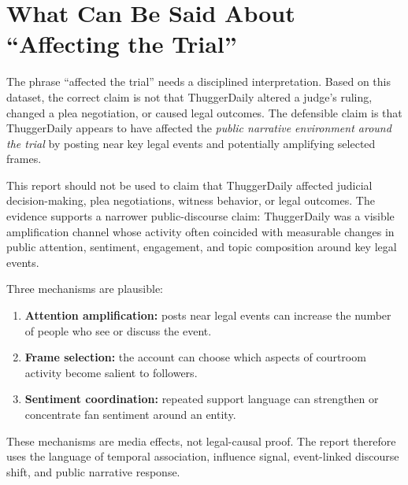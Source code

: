 \documentclass[12pt]{article}
\begin{document}
\section{What Can Be Said About ``Affecting the Trial''}
The phrase ``affected the trial'' needs a disciplined interpretation. Based on this dataset, the correct claim is not that ThuggerDaily altered a judge's ruling, changed a plea negotiation, or caused legal outcomes. The defensible claim is that ThuggerDaily appears to have affected the \emph{public narrative environment around the trial} by posting near key legal events and potentially amplifying selected frames.

This report should not be used to claim that ThuggerDaily affected judicial decision-making, plea negotiations, witness behavior, or legal outcomes. The evidence supports a narrower public-discourse claim: ThuggerDaily was a visible amplification channel whose activity often coincided with measurable changes in public attention, sentiment, engagement, and topic composition around key legal events.

Three mechanisms are plausible:
\begin{enumerate}[leftmargin=*]
\item \textbf{Attention amplification:} posts near legal events can increase the number of people who see or discuss the event.
\item \textbf{Frame selection:} the account can choose which aspects of courtroom activity become salient to followers.
\item \textbf{Sentiment coordination:} repeated support language can strengthen or concentrate fan sentiment around an entity.
\end{enumerate}

These mechanisms are media effects, not legal-causal proof. The report therefore uses the language of temporal association, influence signal, event-linked discourse shift, and public narrative response.

\newpage
\end{document}
